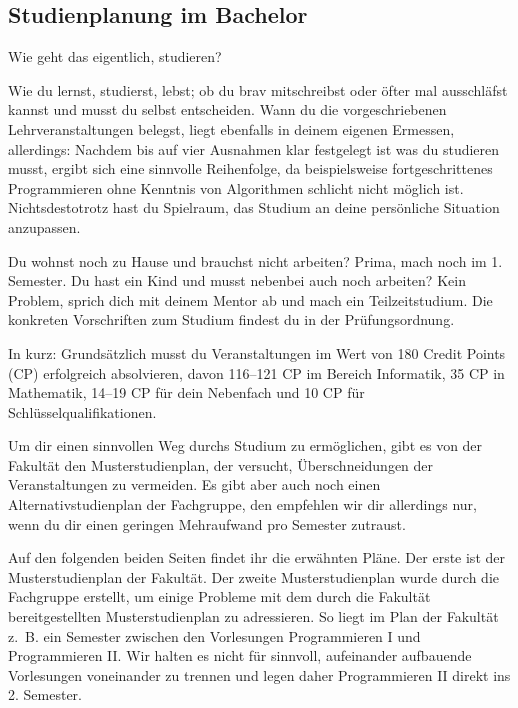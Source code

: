 \subsection{Studienplanung im Bachelor}

Wie geht das eigentlich, studieren?

Wie du lernst, studierst, lebst; ob du brav mitschreibst oder öfter mal ausschläfst kannst und musst du selbst entscheiden. Wann du die vorgeschriebenen Lehrveranstaltungen belegst, liegt ebenfalls in deinem eigenen Ermessen, allerdings: Nachdem bis auf vier Ausnahmen klar festgelegt ist was du studieren musst, ergibt sich eine sinnvolle Reihenfolge, da beispielsweise fortgeschrittenes Programmieren ohne Kenntnis von Algorithmen schlicht nicht möglich ist. Nichtsdestotrotz hast du Spielraum, das Studium an deine persönliche Situation anzupassen.

Du wohnst noch zu Hause und brauchst nicht arbeiten? Prima, mach noch \iftoggle{winter}{Theoretische Informatik 1}{Technische Informatik 2} im 1. Semester. Du hast ein Kind und musst nebenbei auch noch arbeiten? Kein Problem, sprich dich mit deinem Mentor ab und mach ein Teilzeitstudium. Die konkreten Vorschriften zum Studium findest du in der Prüfungsordnung.

In kurz: Grundsätzlich musst du Veranstaltungen im Wert von 180 Credit Points (CP) erfolgreich absolvieren, davon 116–121 CP im Bereich Informatik, 35 CP in Mathematik, 14–19 CP für dein Nebenfach und 10 CP für Schlüsselqualifikationen.


Um dir einen sinnvollen Weg durchs Studium zu ermöglichen, gibt es von der Fakultät den Musterstudienplan, der versucht, Überschneidungen der Veranstaltungen zu vermeiden. Es gibt aber auch noch einen Alternativstudienplan der Fachgruppe, den empfehlen wir dir allerdings nur, wenn du dir einen geringen Mehraufwand pro Semester zutraust.

Auf den folgenden beiden Seiten findet ihr die erwähnten Pläne. Der erste ist der Musterstudienplan der Fakultät. Der zweite Musterstudienplan wurde durch die Fachgruppe erstellt, um einige Probleme mit dem durch die Fakultät bereitgestellten Musterstudienplan zu adressieren. So liegt im Plan der Fakultät z.\ B. ein Semester zwischen den Vorlesungen Programmieren I und Programmieren II. Wir halten es nicht für sinnvoll, aufeinander aufbauende Vorlesungen voneinander zu trennen und legen daher Programmieren II direkt ins 2. Semester. 

